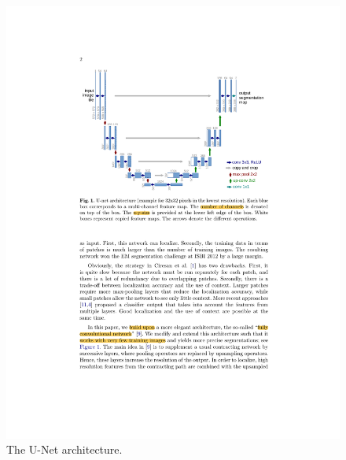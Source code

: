 \begin{figure}[ht]
\centering
\includegraphics[width=\columnwidth]{assets/u_net.pdf}
\caption[Lesion Images]
{The U-Net architecture.}
\label{u_net}
\end{figure}


